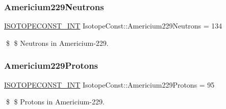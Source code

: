 \subsubsection{\texorpdfstring{Americium229\+Neutrons}{Americium229Neutrons}}
{\footnotesize\ttfamily \mbox{\hyperlink{group___isotope_const-_macros_ga5f18360b3e99483a35c32d789e62621c}{I\+S\+O\+T\+O\+P\+E\+C\+O\+N\+S\+T\+\_\+\+I\+NT}} Isotope\+Const\+::\+Americium229\+Neutrons = 134}

\$ \$ Neutrons in Americium-\/229. \mbox{\label{group___isotope_const-_americium-_am229_ga8bae3b83757fe683b243bc087f657c67}} 
\subsubsection{\texorpdfstring{Americium229\+Protons}{Americium229Protons}}
{\footnotesize\ttfamily \mbox{\hyperlink{group___isotope_const-_macros_ga5f18360b3e99483a35c32d789e62621c}{I\+S\+O\+T\+O\+P\+E\+C\+O\+N\+S\+T\+\_\+\+I\+NT}} Isotope\+Const\+::\+Americium229\+Protons = 95}

\$ \$ Protons in Americium-\/229. 